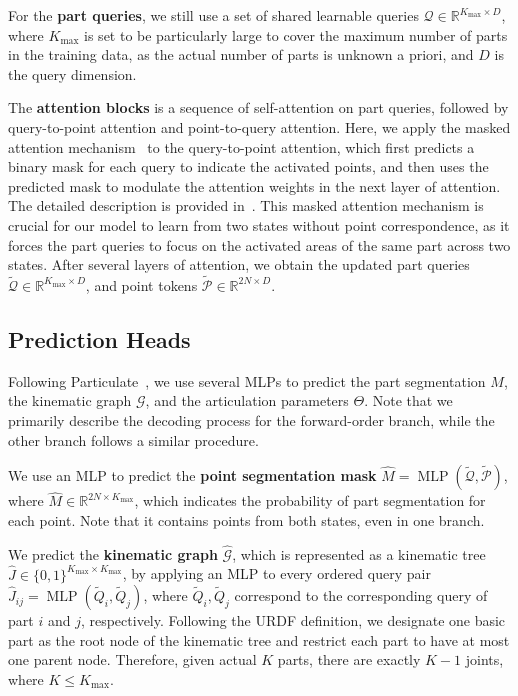 For the \textbf{part queries},
we still use a set of shared learnable queries $\mathcal{Q} \in \mathbb{R}^{K_{\max} \times D}$,
where $K_{\max}$ is set to be particularly large to cover the maximum number of parts in the training data,
as the actual number of parts is unknown a priori,
and $D$ is the query dimension.

The \textbf{attention blocks} 
is a sequence of self-attention on part queries, followed by query-to-point attention and point-to-query attention.
Here, we apply the masked attention mechanism~\cite{cheng2022masked} to the query-to-point attention,
which first predicts a binary mask for each query to indicate the activated points,
and then uses the predicted mask to modulate the attention weights in the next layer of attention.
The detailed description is provided in~.
This masked attention mechanism is crucial for our model to learn from two states without point correspondence,
as it forces the part queries to focus on the activated areas of the same part across two states.
After several layers of attention, we obtain the updated part queries
$\tilde{\mathcal{Q}} \in \mathbb{R}^{K_{\max} \times D}$,
and point tokens $\tilde{\mathcal{P}} \in \mathbb{R}^{2N \times D}$.

\subsection{Prediction Heads}
\label{sec:decoder}
Following Particulate~\cite{li2025particulate}, we use several MLPs to predict the part segmentation
$M$,
the kinematic graph $\mathcal{G}$,
and the articulation parameters $\Theta$.
Note that we primarily describe the decoding process for the forward-order branch, while the other branch follows a similar procedure.

We use an MLP to predict the \textbf{point segmentation mask}
$\hat{M} = \operatorname{MLP} (\tilde{\mathcal{Q}}, \tilde{\mathcal{P}})$,
where $\hat{M}\in \mathbb{R}^{2N \times K_{\max}}$,
which indicates the probability of part segmentation for each point.
Note that it contains points from both states,
even in one branch.

We predict the \textbf{kinematic graph} $\hat{\mathcal{G}}$,
which is represented as a kinematic tree $\hat{J} \in \{0,1\}^{K_{\max} \times K_{\max}}$,
by applying an MLP to every ordered query pair
$\hat{J}_{ij} = \operatorname{MLP} (\tilde{Q}_i,\tilde{Q}_j)$,
where $\tilde{Q}_i,\tilde{Q}_j$ correspond to the corresponding query of part $i$ and $j$, respectively.
Following the URDF definition, we designate one basic part as the root node of the kinematic tree and restrict each part to have at most one parent node.
Therefore, given actual $K$ parts, there are exactly $K-1$ joints,
where $K \le K_{\max}$.


